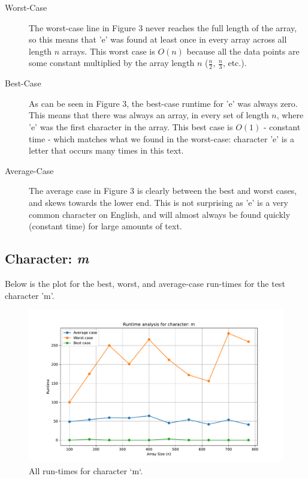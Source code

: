 \documentclass{article}
\begin{document}
\begin{description}
    \item[Worst-Case] The worst-case line in Figure 3 never reaches the full length of the array, so this means that 'e' was found at least once in every array across all length $n$ arrays. This worst case is $O(n)$ because all the data points are some constant multiplied by the array length $n$ ($\frac{n}{2}$, $\frac{n}{3}$, etc.).
    \item[Best-Case] As can be seen in Figure 3, the best-case runtime for 'e' was always zero. This means that there was always an array, in every set of length $n$, where 'e' was the first character in the array. This best case is $O(1)$ - constant time - which matches what we found in the worst-case: character 'e' is a letter that occurs many times in this text. 
    \item[Average-Case] The average case in Figure 3 is clearly between the best and worst cases, and skews towards the lower end. This is not surprising as 'e' is a very common character on English, and will almost always be found quickly (constant time) for large amounts of text. 
\end{description}

\subsection{Character: \textit{m}}
Below is the plot for the best, worst, and average-case run-times for the test character 'm'.
	
	\begin{figure}[H]
		\centering
		\includegraphics[width=\textwidth]{runtime_analysis_m.pdf}
		\caption{All run-times for character `m`.}
	\end{figure}
\end{document}

